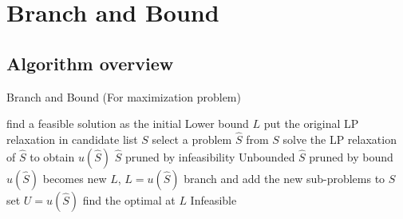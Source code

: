         \section{Branch and Bound}

            \subsection{Algorithm overview}
                \begin{algorithm}[H]
                    \caption{Branch and Bound (For maximization problem)}
                    \begin{algorithmic}[1]
                        \State find a feasible solution as the initial Lower bound $L$
                        \State put the original LP relaxation in candidate list $S$
                            \State select a problem $\hat{S}$ from $S$
                            \State solve the LP relaxation of $\hat{S}$ to obtain $u(\hat{S})$
                                \State $\hat{S}$ pruned by infeasibility
                                \State \Return Unbounded
                                \State $\hat{S}$ pruned by bound
                                    \State $u(\hat{S})$ becomes new $L$, $L=u(\hat{S})$
                                    \State branch and add the new sub-problems to $S$
                                        \State set $U=u(\hat{S})$
                                    \EndIf
                                \EndIf
                            \EndIf
                        \EndWhile
                            \State find the optimal at $L$
                        \Else
                            \State Infeasible
                        \EndIf
                    \end{algorithmic}
                \end{algorithm}

